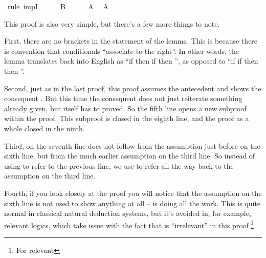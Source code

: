 \begin{isabellebody}
\ {\isacharparenleft}rule\ impI{\isacharparenright}\isanewline
\ \ \ \ \isamarkupfalse%
\ {\isachardoublequoteopen}B{\isachardoublequoteclose}\isanewline
\ \ \ \ \isamarkupfalse%
\ {\isacharbackquoteopen}A{\isacharbackquoteclose}\ \isamarkupfalse%
\ {\isachardoublequoteopen}A{\isachardoublequoteclose}\isacommand{{\isachardot}}\isamarkupfalse%
\isanewline
\ \ \isamarkupfalse%
\isanewline
{}\isamarkupfalse%
%
\endisatagproof
{\isafoldproof}%
%
\isadelimproof
%
\endisadelimproof
%
\begin{isamarkuptext}%
This proof is also very simple, but there's a few more things to note.%
\end{isamarkuptext}\isamarkuptrue%
%
\begin{isamarkuptext}%
First, there are no brackets in the statement of the lemma. This is because there is 
convention that conditionals ``associate to the right''. In other words, the lemma translates back
into English as ``if  then if   then  '', as opposed to ``if if
  then  then ''.%
\end{isamarkuptext}\isamarkuptrue%
%
\begin{isamarkuptext}%
Second, just as in the last proof, this proof assumes the antecedent  and shows
the consequent . But this time the consequent does not just reiterate something
already given, but itself has to proved. So the fifth line opens a new subproof within the proof. 
This subproof is closed in the eighth line, and the proof as a whole closed in the ninth.%
\end{isamarkuptext}\isamarkuptrue%
%
\begin{isamarkuptext}%
Third, on the seventh line   does not follow from the assumption just before on
the sixth line, but from the much earlier assumption on the third line. So instead of using 
to refer to the previous line, we use  to refer all the way back to the assumption
on the third line.%
\end{isamarkuptext}\isamarkuptrue%
%
\begin{isamarkuptext}%
Fourth, if you look closely at the proof you will notice that the assumption  on
the sixth line is not used to show anything at all --  is doing all the work. This is quite
normal in classical natural deduction systems, but it's avoided in, for example, relevant logics,
which take issue with the fact that  is ``irrelevant'' in this proof.\footnote{For relevant
}
\end{isamarkuptext}
\end{isabellebody}

